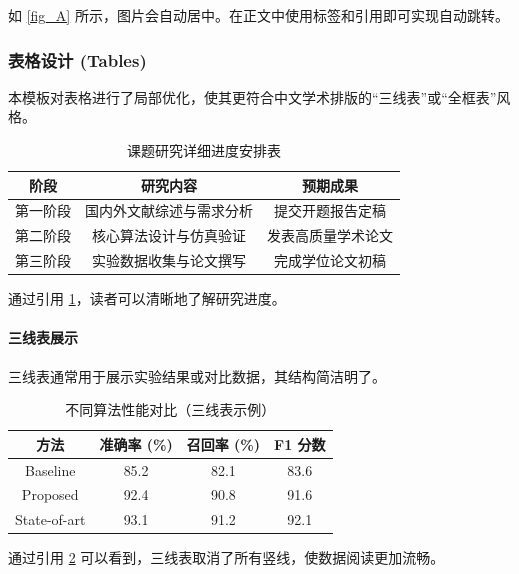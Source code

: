 \documentclass[a4paper,zihao=-4,AutoFakeBold,AutoFakeSlant]{ctexart}
\begin{document}
如 \ref{fig_A} 所示，图片会自动居中。在正文中使用标签和引用即可实现自动跳转。

\subsubsection{表格设计 (Tables)}

本模板对表格进行了局部优化，使其更符合中文学术排版的“三线表”或“全框表”风格。

\begin{table}[htb]
    \centering
    \caption{课题研究详细进度安排表} \label{tab_schedule}
    \renewcommand{\arraystretch}{1.5}
    \begin{tabular}{|c|c|c|}
        \hline
        \textbf{阶段} & \textbf{研究内容} & \textbf{预期成果} \\
        \hline
        第一阶段 & 国内外文献综述与需求分析 & 提交开题报告定稿 \\
        \hline
        第二阶段 & 核心算法设计与仿真验证 & 发表高质量学术论文 \\
        \hline
        第三阶段 & 实验数据收集与论文撰写 & 完成学位论文初稿 \\
        \hline
    \end{tabular}
\end{table}

通过引用 \ref{tab_schedule}，读者可以清晰地了解研究进度。

\paragraph{三线表展示}

三线表通常用于展示实验结果或对比数据，其结构简洁明了。

\begin{table}[htb]
    \centering
    \caption{不同算法性能对比（三线表示例）} \label{tab_3line}
    \renewcommand{\arraystretch}{1.5}
    \begin{tabular}{cccc}
        \hline
        \textbf{方法} & \textbf{准确率 (\%)} & \textbf{召回率 (\%)} & \textbf{F1 分数} \\
        \hline
        Baseline & 85.2 & 82.1 & 83.6 \\
        Proposed & 92.4 & 90.8 & 91.6 \\
        State-of-art & 93.1 & 91.2 & 92.1 \\
        \hline
    \end{tabular}
\end{table}

通过引用 \ref{tab_3line} 可以看到，三线表取消了所有竖线，使数据阅读更加流畅。
\end{document}
